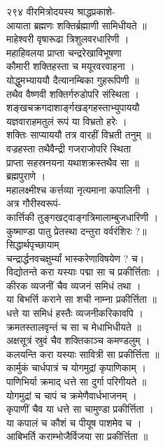 \documentclass[11pt, openany]{book}
\begin{document}
{{{२९४ वीरमित्रोदयस्य श्राद्धप्रकाशे-\\
आयाता ब्रह्मणः शक्तिर्ब्रह्माणी सामिधीयते ॥\\
माहेश्वरी वृषारूढा त्रिशुलवरधारिणी ।\\
महाहिवलया प्राप्ता चन्द्ररेखाविभूषणा \textbar{}\textbar{}\\
कौमारी शक्तिहस्ता च मयूरवरवाहना ।\\
योद्धुमभ्याययौ दैत्यानम्बिका गुहरूपिणी ॥\\
तथैव वैष्णवी शक्तिर्गरुडोपरि संस्थिता ।\\
शङ्खचक्रगदाशार्ङ्गखड्गहस्ताभ्युपाययौ\\
यज्ञवाराहमतुलं रूपं या विभ्रतो हरेः ।\\
शक्तिः साप्याययौ तत्र वारहीं विभ्रती तनुम् ॥\\
वज्रहस्ता तथैवैन्द्री गजराजोपरि स्थिता \textbar{}\\
प्राप्ता सहस्रनयना यथाशक्रस्तथैव सा ॥\\
ब्रह्मपुराणे ।\\
महालक्ष्मीश्च कर्त्तव्या नृत्यमाना कपालिनी ।\\
अत्र गौरीस्वरूपं-\\
कार्त्तिकी तुङ्गखट्वाङ्गत्रिमालाम्बुजधारिणी ।\\
कुष्माण्डा पातु प्रेतस्था दन्तुरा वर्वरंशिरः ?॥\\
सिद्धार्थपृच्छायाम्\\
चन्द्रार्द्धनवचक्षुर्म्यां भास्करेणाविषयेण ? च।\\
विद्योतन्ते करा यस्याः पद्मा सा च प्रकीर्त्तिताः ।\\
कीरक व्यजनीं चैव व्यजनं समिधं तथा ।\\
या बिभर्त्ति कराने सा शची नाम्ना प्रकीर्त्तिता ॥\\
धत्ते या समिधं हस्तैः व्यजनीकरिकावपि ।\\
क्रमतस्तालवृन्तं च सा च मेधाभिधीयते ॥\\
अक्षसूत्रं स्रुवं चैव शक्तिकाञ्च कमण्डलुम् ।\\
कलयन्ति करा यस्याः सावित्री सा प्रकीर्त्तिता ॥\\
कार्मुकं चार्धपात्रं च योगमुद्रां कृपाणिकाम् ।\\
पाणिभिर्या क्रमाद् धत्ते सा दुर्गा परिगीयते ॥\\
योगमुद्रां च चापं च क्रमेणैवार्धभाजनम् ।\\
कृपाणीं चैव या धत्ते सा चामुण्डा प्रकीर्त्तिता ।\\
या कपालं च कौशं च पीयूष पाशमेव च ।\\
आबिभर्ति कराम्भोजैर्विजया सा प्रकीर्त्तिता ॥

}}}
\end{document}
